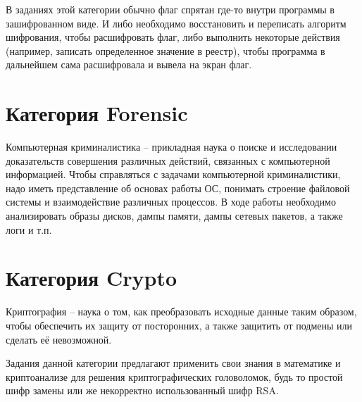 В заданиях этой категории обычно флаг спрятан где-то внутри программы в зашифрованном виде. И либо необходимо восстановить и переписать алгоритм шифрования, чтобы расшифровать флаг, либо выполнить некоторые действия (например, записать определенное значение в реестр), чтобы программа в дальнейшем сама расшифровала и вывела на экран флаг.










\section{Категория Forensic}

Компьютерная криминалистика – прикладная наука о поиске и исследовании доказательств совершения различных действий, связанных с компьютерной информацией.
Чтобы справляться с задачами компьютерной криминалистики, надо иметь представление об основах работы ОС, понимать строение файловой системы и взаимодействие различных процессов. В ходе работы необходимо анализировать образы дисков, дампы памяти, дампы сетевых пакетов, а также логи и т.п.







\section{Категория Crypto}

Криптография – наука о том, как преобразовать исходные данные таким образом, чтобы обеспечить их защиту от посторонних, а также защитить от подмены или сделать её невозможной.

Задания данной категории предлагают применить свои знания в математике и криптоанализе для решения криптографических головоломок, будь то простой шифр замены или же некорректно использованный шифр RSA.





